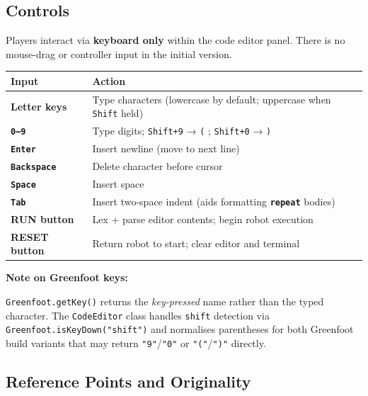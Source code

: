 \documentclass[12pt,a4paper]{article}
\newcommand{\keyword}[1]{\textcolor{keyword}{\texttt{\bfseries #1}}}
\newcommand{\gddfield}[2]{%
  \noindent\begin{minipage}[t]{3.5cm}\bfseries\color{accent}\sffamily#1\end{minipage}%
  \hspace{8pt}%
  \begin{minipage}[t]{\dimexpr\linewidth-3.5cm-8pt\relax}%
    #2
  \end{minipage}\par\smallskip}
\begin{document}
\subsection{Controls}

\begin{tcolorbox}[gddbox, title={Controls}]
Players interact via \textbf{keyboard only} within the code editor panel. There is no mouse-drag or controller input in the initial version.

\vspace{8pt}
\begin{tabularx}{\linewidth}{>{\ttfamily\bfseries}p{3cm} X}
  \toprule
  \textrm{Input} & Action \\
  \midrule
  Letter keys & Type characters (lowercase by default; uppercase when \texttt{Shift} held) \\
  \texttt{0--9} & Type digits; \texttt{Shift+9} → \texttt{(} ; \texttt{Shift+0} → \texttt{)} \\
  \texttt{Enter} & Insert newline (move to next line) \\
  \texttt{Backspace} & Delete character before cursor \\
  \texttt{Space} & Insert space \\
  \texttt{Tab} & Insert two-space indent (aids formatting \keyword{repeat} bodies) \\
  \midrule
  \textrm{RUN button} & Lex + parse editor contents; begin robot execution \\
  \textrm{RESET button} & Return robot to start; clear editor and terminal \\
  \bottomrule
\end{tabularx}

\vspace{8pt}
\gddfield{Note on Greenfoot keys:}{\texttt{Greenfoot.getKey()} returns the \emph{key-pressed} name rather than the typed character. The \texttt{CodeEditor} class handles \texttt{shift} detection via \texttt{Greenfoot.isKeyDown("shift")} and normalises parentheses for both Greenfoot build variants that may return \texttt{"9"}/\texttt{"0"} or \texttt{"("}/\texttt{")"} directly.}
\end{tcolorbox}

\subsection{Reference Points and Originality}
\end{document}
